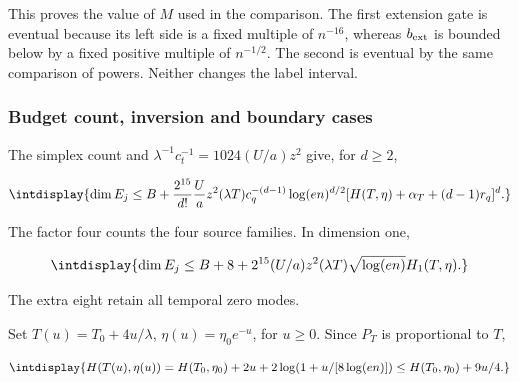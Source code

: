 
This proves the value of \(M\) used in the comparison. The first extension gate is eventual because its left side is a fixed multiple of \(n^{-16}\), whereas \(b_{\rm ext}\) is bounded below by a fixed positive multiple of \(n^{-1/2}\). The second is eventual by the same comparison of powers. Neither changes the label interval.


\subsubsection{Budget count, inversion and boundary cases}
\label{int:compact-budget-inversion-proof}
\label{int:harmonic-budget-inversion-proof}


The simplex count and \(\lambda^{-1}c_t^{-1}=1024(U/a)z^2\) give, for \(d\ge2\),


\begingroup\renewcommand{\theHequation}{intdisplay.632}
\begin{equation}
\intdisplay{
\dim E_j\le B+
 \frac{2^{15}}{d!}\frac Ua z^2(\lambda T)c_q^{-(d-1)}
 \log(en)^{d/2}[H(T,\eta)+\alpha_T+(d-1)r_q]^d.
}
\label{int:eq-0268-harmonic-variable-rank-bound}
\end{equation}
\endgroup


The factor four counts the four source families. In dimension one,


\begingroup\renewcommand{\theHequation}{intdisplay.633}
\begin{equation}
\intdisplay{
\dim E_j\le B+8+
 2^{15}(U/a)z^2(\lambda T)\sqrt{\log(en)}H_1(T,\eta).
}
\label{int:eq-0269-harmonic-variable-rank-bound-in-dimension-one}
\end{equation}
\endgroup


The extra eight retain all temporal zero modes.



Set \(T(u)=T_0+4u/\lambda\), \(\eta(u)=\eta_0e^{-u}\), for \(u\ge0\). Since \(P_T\) is proportional to \(T\),


\begingroup\renewcommand{\theHequation}{intdisplay.634}
\begin{equation*}
\intdisplay{
H(T(u),\eta(u))=H(T_0,\eta_0)+2u+
             2\log(1+u/[8\log(en)])
               \le H(T_0,\eta_0)+9u/4.
}
\end{equation*}
\endgroup

